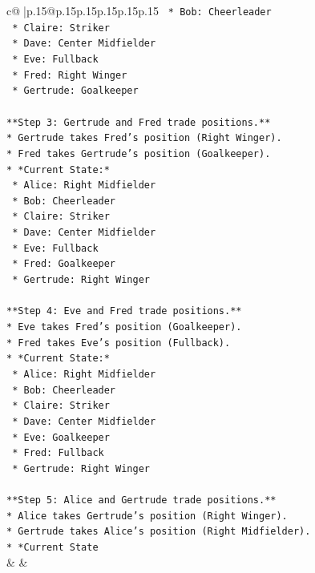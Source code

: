 \documentclass{article}
\begin{document}
{\begin{supertabular}{c@{$\;$}|p{.15\linewidth}@{}p{.15\linewidth}p{.15\linewidth}p{.15\linewidth}p{.15\linewidth}p{.15\linewidth}}
{{{\texttt{    *   Bob: Cheerleader} \\
\texttt{    *   Claire: Striker} \\
\texttt{    *   Dave: Center Midfielder} \\
\texttt{    *   Eve: Fullback} \\
\texttt{    *   Fred: Right Winger} \\
\texttt{    *   Gertrude: Goalkeeper} \\
\\ 
\texttt{**Step 3: Gertrude and Fred trade positions.**} \\
\texttt{*   Gertrude takes Fred's position (Right Winger).} \\
\texttt{*   Fred takes Gertrude's position (Goalkeeper).} \\
\texttt{*   *Current State:*} \\
\texttt{    *   Alice: Right Midfielder} \\
\texttt{    *   Bob: Cheerleader} \\
\texttt{    *   Claire: Striker} \\
\texttt{    *   Dave: Center Midfielder} \\
\texttt{    *   Eve: Fullback} \\
\texttt{    *   Fred: Goalkeeper} \\
\texttt{    *   Gertrude: Right Winger} \\
\\ 
\texttt{**Step 4: Eve and Fred trade positions.**} \\
\texttt{*   Eve takes Fred's position (Goalkeeper).} \\
\texttt{*   Fred takes Eve's position (Fullback).} \\
\texttt{*   *Current State:*} \\
\texttt{    *   Alice: Right Midfielder} \\
\texttt{    *   Bob: Cheerleader} \\
\texttt{    *   Claire: Striker} \\
\texttt{    *   Dave: Center Midfielder} \\
\texttt{    *   Eve: Goalkeeper} \\
\texttt{    *   Fred: Fullback} \\
\texttt{    *   Gertrude: Right Winger} \\
\\ 
\texttt{**Step 5: Alice and Gertrude trade positions.**} \\
\texttt{*   Alice takes Gertrude's position (Right Winger).} \\
\texttt{*   Gertrude takes Alice's position (Right Midfielder).} \\
\texttt{*   *Current State} \\
            }
        }
    }
    & & \\ \\


\end{supertabular}}
\end{document}
